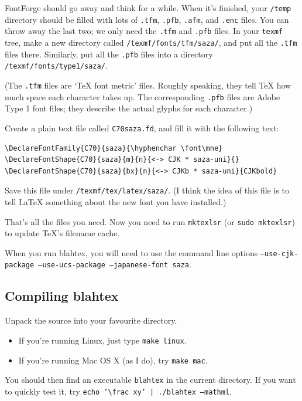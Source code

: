\documentclass{article}
\newcommand{\texcommand}[1]{\textbackslash{}#1}
\begin{document}
FontForge should go away and think for a while. When it's finished, your \texttt{/temp} directory should be filled with lots of \texttt{.tfm}, \texttt{.pfb}, \texttt{.afm}, and \texttt{.enc} files. You can throw away the last two; we only need the \texttt{.tfm} and \texttt{.pfb} files. In your \texttt{texmf} tree, make a new directory called \texttt{/texmf/fonts/tfm/saza/}, and put all the \texttt{.tfm} files there. Similarly, put all the \texttt{.pfb} files into a directory \texttt{/texmf/fonts/type1/saza/}.

(The \texttt{.tfm} files are `\TeX{} font metric' files. Roughly speaking, they tell \TeX{} how much space each character takes up. The corresponding \texttt{.pfb} files are Adobe Type 1 font files; they describe the actual glyphs for each character.)

Create a plain text file called \texttt{C70saza.fd}, and fill it with the following text:
\begin{verbatim}
\DeclareFontFamily{C70}{saza}{\hyphenchar \font\mne} 
\DeclareFontShape{C70}{saza}{m}{n}{<-> CJK * saza-uni}{} 
\DeclareFontShape{C70}{saza}{bx}{n}{<-> CJKb * saza-uni}{CJKbold}
\end{verbatim}
Save this file under \texttt{/texmf/tex/latex/saza/}. (I think the idea of this file is to tell \LaTeX{} something about the new font you have installed.)

That's all the files you need. Now you need to run \texttt{mktexlsr} (or \texttt{sudo mktexlsr}) to update \TeX's filename cache.

When you run blahtex, you will need to use the command line options \texttt{--use-cjk-package --use-ucs-package --japanese-font saza}.

\subsection{Compiling blahtex}\label{sec:compiling-blahtex}

Unpack the source into your favourite directory.
\begin{itemize}
\item If you're running Linux, just type \texttt{make linux}.
\item If you're running Mac OS X (as I do), try \texttt{make mac}.
\end{itemize}
You should then find an executable \texttt{blahtex} in the current directory. If you want to quickly test it, try \texttt{echo '\texcommand{frac} xy' | ./blahtex --mathml}.
\end{document}
